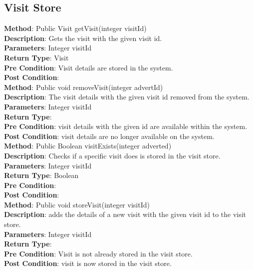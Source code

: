 \documentclass{l3deliverable}
\begin{document}
\subsection{Visit Store}

\textbf{Method}: Public Visit getVisit(integer visitId)\\
\textbf{Description}: Gets the visit with the given visit id. \\
\textbf{Parameters}: Integer visitId\\
\textbf{Return Type}: Visit\\
\textbf{Pre Condition}: Visit details are stored in the system.\\
\textbf{Post Condition}:\\

\textbf{Method}: Public void removeVisit(integer advertId)\\
\textbf{Description}: The visit details with the given visit id removed from the system. \\
\textbf{Parameters}: Integer visitId\\
\textbf{Return Type}:\\
\textbf{Pre Condition}: visit details with the given id are available within the system.\\
\textbf{Post Condition}: visit details are no longer available on the system.\\

\textbf{Method}: Public Boolean visitExists(integer adverted)\\
\textbf{Description}: Checks if a specific visit does is stored in the visit store. \\
\textbf{Parameters}: Integer visitId\\
\textbf{Return Type}: Boolean\\
\textbf{Pre Condition}:\\
\textbf{Post Condition}:\\

\textbf{Method}: Public void storeVisit(integer visitId) \\
\textbf{Description}:  adds the details of a new visit with the given visit id to the visit store.\\
\textbf{Parameters}: Integer visitId\\
\textbf{Return Type}:\\
\textbf{Pre Condition}: Visit is not already stored in the visit store.\\
\textbf{Post Condition}: visit is now stored in the visit store.\\
\end{document}
